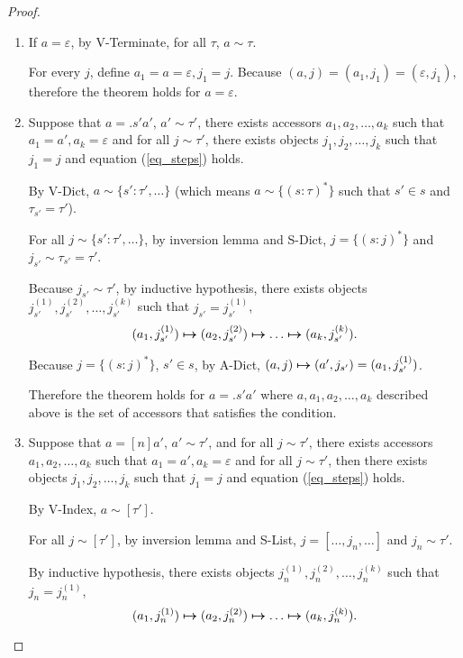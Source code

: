 \documentclass[11pt]{article}
\newcommand{\matches}[2]{{#1}\sim{#2}}   %
\begin{document}
\begin{proof}
  \
  \begin{enumerate}
    \item If \(a=\varepsilon\), by V-Terminate, for all \(\tau\), \(\matches{a}{\tau}\).

          For every \(j\), define \(a_1=a=\varepsilon, j_1=j\). Because \((a,j)=(a_1,j_1)=(\varepsilon,j_1)\), therefore the theorem holds for \(a=\varepsilon\).
    \item Suppose that \(a=.s'a'\), \(\matches{a'}{\tau'}\), there exists accessors \(a_1, a_2, \ldots, a_k\) such that \(a_1 = a', a_k = \varepsilon\) and for all \(\matches{j}{\tau'}\), there exists objects \(j_1, j_2, \ldots, j_k\) such that \(j_1=j\) and equation (\ref{eq_steps}) holds.

          By V-Dict, \(\matches{a}{ \{s':\tau',\dots\} }\) (which means \(\matches{a}{\{(s:\tau)^*\}}\) such that \(s' \in s\) and \(\tau_{s'}=\tau'\)).

          For all \(\matches{j}{ \{s':\tau',\dots\} }\), by inversion lemma and S-Dict, \(j=\{(s:j)^*\}\) and \(\matches{j_{s'}}{\tau_{s'}}=\tau'\).

          Because \(\matches{j_{s'}}{\tau'}\), by inductive hypothesis, there exists objects \(j_{s'}^{(1)},j_{s'}^{(2)},\ldots,j_{s'}^{(k)}\) such that \(j_{s'}=j_{s'}^{(1)}\),
          \[(a_1,j_{s'}^{(1)}) \boldsymbol{\mapsto}(a_2,j_{s'}^{(2)}) \boldsymbol{\mapsto}\ldots\boldsymbol{\mapsto} (a_k,j_{s'}^{(k)}).\]

          Because \(j=\{(s:j)^*\}\), \(s'\in s\), by A-Dict, \((a,j) \boldsymbol{\mapsto} (a',j_{s'})=(a_1,j_{s'}^{(1)})\).
          
          Therefore the theorem holds for \(a=.s'a'\) where \(a, a_1, a_2, \ldots, a_k\) described above is the set of accessors that satisfies the condition.
    \item Suppose that \(a=[n]a'\), \(\matches{a'}{\tau'}\), and for all \(\matches{j}{\tau'}\), there exists accessors \(a_1, a_2, \ldots, a_k\) such that \(a_1 = a', a_k = \varepsilon\) and for all \(\matches{j}{\tau'}\), then there exists objects \(j_1, j_2, \ldots, j_k\) such that \(j_1=j\) and equation (\ref{eq_steps}) holds.

          By V-Index, \(\matches{a}{[\tau']}\).

          For all \(\matches{j}{[\tau']}\), by inversion lemma and S-List, \(j=[\dots,j_n,\dots]\) and \(\matches{j_n}{\tau'}\).

          By inductive hypothesis, there exists objects \(j_{n}^{(1)},j_{n}^{(2)},\ldots,j_{n}^{(k)}\) such that \(j_{n}=j_{n}^{(1)}\),
          \[(a_1,j_{n}^{(1)}) \boldsymbol{\mapsto}(a_2,j_{n}^{(2)}) \boldsymbol{\mapsto}\ldots\boldsymbol{\mapsto} (a_k,j_{n}^{(k)}).\]


\end{enumerate}
\end{proof}
\end{document}

